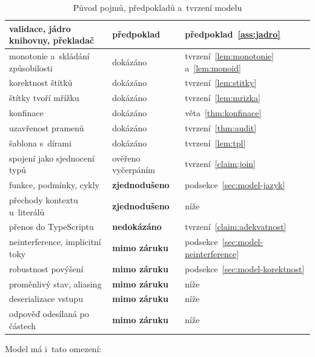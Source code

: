 \begin{table}[htbp]
\begin{tabularx}{\textwidth}{@{}YlY@{}}
        validace, jádro knihovny, překladač & \textbf{předpoklad} & předpoklad~\ref{ass:jadro} \\
        \midrule
        monotonie a~skládání způsobilosti & dokázáno & tvrzení~\ref{lem:monotonie} a~\ref{lem:monoid} \\
        korektnost štítků                & dokázáno & tvrzení~\ref{lem:stitky} \\
        štítky tvoří mřížku              & dokázáno & tvrzení~\ref{lem:mrizka} \\
        konfinace                        & dokázáno & věta~\ref{thm:konfinace} \\
        uzavřenost pramenů               & dokázáno & tvrzení~\ref{thm:audit} \\
        šablona s~dírami                 & dokázáno & tvrzení~\ref{lem:tpl} \\
        spojení jako sjednocení typů     & ověřeno vyčerpáním & tvrzení~\ref{claim:join} \\
        \midrule
        funkce, podmínky, cykly          & \textbf{zjednodušeno} & podsekce~\ref{sec:model-jazyk} \\
        přechody kontextu u~literálů     & \textbf{zjednodušeno} & níže \\
        \midrule
        přenos do TypeScriptu            & \textbf{nedokázáno} & tvrzení~\ref{claim:adekvatnost} \\
        neinterference, implicitní toky  & \textbf{mimo záruku} & podsekce~\ref{sec:model-neinterference} \\
        robustnost povýšení              & \textbf{mimo záruku} & podsekce~\ref{sec:model-korektnost} \\
        proměnlivý stav, aliasing        & \textbf{mimo záruku} & níže \\
        deserializace vstupu             & \textbf{mimo záruku} & níže \\
        odpověď odesílaná po částech     & \textbf{mimo záruku} & níže \\
        \bottomrule
    \end{tabularx}
    \caption{Původ pojmů, předpokladů a~tvrzení modelu}
    \label{tab:puvod}
\end{table}

Model má i~tato omezení:

